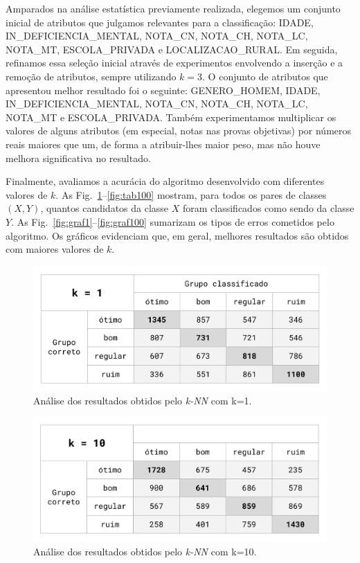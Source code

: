 \documentclass[12pt]{article}
\begin{document}
Amparados na análise estatística previamente realizada, elegemos um conjunto inicial de atributos que julgamos relevantes para a classificação: IDADE, IN\_DEFICIENCIA\_MENTAL, NOTA\_CN, NOTA\_CH, NOTA\_LC, NOTA\_MT, ESCOLA\_PRIVADA e LOCALIZACAO\_RURAL.
Em seguida, refinamos essa seleção inicial através de experimentos envolvendo a inserção e a remoção de atributos, sempre utilizando $k=3$.
O conjunto de atributos que apresentou melhor resultado foi o seguinte: GENERO\_HOMEM, IDADE, IN\_DEFICIENCIA\_MENTAL, NOTA\_CN, NOTA\_CH, NOTA\_LC, NOTA\_MT e ESCOLA\_PRIVADA.
Também experimentamos multiplicar os valores de alguns atributos (em especial, notas nas provas objetivas) por números reais maiores que um, de forma a atribuir-lhes maior peso, mas não houve melhora significativa no resultado.

Finalmente, avaliamos a acurácia do algoritmo desenvolvido com diferentes valores de $k$.
As Fig.~\ref{fig:tab1}--\ref{fig:tab100} mostram, para todos os pares de classes $(X, Y)$, quantos candidatos da classe $X$ foram classificados como sendo da classe $Y$.
As Fig.~\ref{fig:graf1}--\ref{fig:graf100} sumarizam os tipos de erros cometidos pelo algoritmo.
Os gráficos evidenciam que, em geral, melhores resultados são obtidos com maiores valores de $k$.

\begin{figure}[H]
\centering\includegraphics[width=.60\linewidth]{plot-white1.png}
\caption{Análise dos resultados obtidos pelo \emph{k-NN} com k=1.}
\label{fig:tab1}
\end{figure}

\begin{figure}[H]
\centering\includegraphics[width=.60\linewidth]{plot-white10.png}
\caption{Análise dos resultados obtidos pelo \emph{k-NN} com k=10.}
\label{fig:tab10}
\end{figure}
\end{document}
